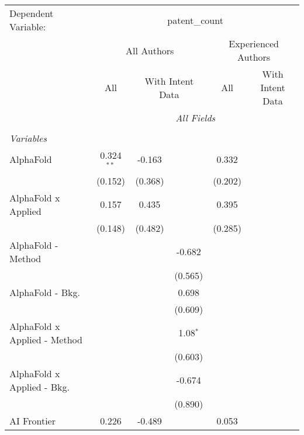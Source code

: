 \begingroup
\centering
\begin{tabular}{lcccccc}
   \tabularnewline \midrule \midrule
   Dependent Variable: & \multicolumn{6}{c}{patent\_count}\\
 & \multicolumn{3}{c}{All Authors} & \multicolumn{3}{c}{Experienced Authors} \\
\cmidrule(lr){2-4} \cmidrule(lr){5-7}
 & \multicolumn{1}{c}{All} & \multicolumn{2}{c}{With Intent Data} & \multicolumn{1}{c}{All} & \multicolumn{2}{c}{With Intent Data} \\
\cmidrule(lr){2-2} \cmidrule(lr){3-4} \cmidrule(lr){5-5} \cmidrule(lr){6-7}
 & \multicolumn{6}{c}{\textit{All Fields}} \\ \\
   \emph{Variables}\\
   AlphaFold                      & 0.324$^{**}$ & -0.163  &             & 0.332        &        &   \\   
                                  & (0.152)      & (0.368) &             & (0.202)      &        &   \\   
   AlphaFold x Applied            & 0.157        & 0.435   &             & 0.395        &        &   \\   
                                  & (0.148)      & (0.482) &             & (0.285)      &        &   \\   
   AlphaFold - Method             &              &         & -0.682      &              &        &   \\   
                                  &              &         & (0.565)     &              &        &   \\   
   AlphaFold - Bkg.               &              &         & 0.698       &              &        &   \\   
                                  &              &         & (0.609)     &              &        &   \\   
   AlphaFold x Applied - Method   &              &         & 1.08$^{*}$  &              &        &   \\   
                                  &              &         & (0.603)     &              &        &   \\   
   AlphaFold x Applied - Bkg.     &              &         & -0.674      &              &        &   \\   
                                  &              &         & (0.890)     &              &        &   \\   
   AI Frontier                    & 0.226        & -0.489  &             & 0.053        &        &   \\   

\end{tabular}
